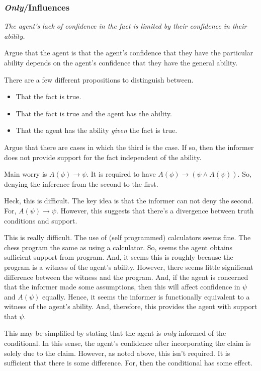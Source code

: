\documentclass[10pt]{article}
\begin{document}
\subsubsection{\emph{Only}/Influences}
\label{sec:only}

{
  \color{red}
  \emph{The agent's lack of confidence in the fact is limited by their confidence in their ability.}
}

Argue that the agent is that the agent's confidence that they have the particular ability depends on the agent's confidence that they have the general ability.

There are a few different propositions to distinguish between.
\begin{itemize}
\item That the fact is true.
\item That the fact is true and the agent has the ability.
\item That the agent has the ability \emph{given} the fact is true.
\end{itemize}

Argue that there are cases in which the third is the case.
If so, then the informer does not provide support for the fact independent of the ability.

Main worry is \(A(\phi) \rightarrow \psi\).
It is required to have \(A(\phi) \rightarrow (\psi \land A(\psi))\).
So, denying the inference from the second to the first.

Heck, this is difficult.
The key idea is that the informer can not deny the second.
For, \(A(\psi) \rightarrow \psi\).
However, this suggests that there's a divergence between truth conditions and support.

This is really difficult.
The use of (self programmed) calculators seems fine.
The chess program the same as using a calculator.
So, seems the agent obtains sufficient support from program.
And, it seems this is roughly because the program is a witness of the agent's ability.
However, there seems little significant difference between the witness and the program.
And, if the agent is concerned that the informer made some assumptions, then this will affect confidence in \(\psi\) and \(A(\psi)\) equally.
Hence, it seems the informer is functionally equivalent to a witness of the agent's ability.
And, therefore, this provides the agent with support that \(\psi\).

This may be simplified by stating that the agent is \emph{only} informed of the conditional.
In this sense, the agent's confidence after incorporating the claim is solely due to the claim.
However, as noted above, this isn't required.
It is sufficient that there is some difference.
For, then the conditional has some effect.
\end{document}
